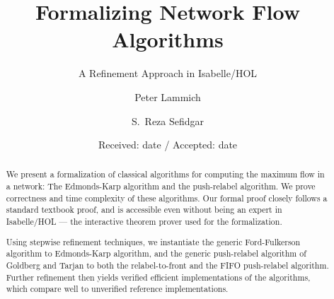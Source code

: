 \documentclass[smallcondensed]{svjour3}     %
\begin{document}
\title{Formalizing Network Flow Algorithms}
\subtitle{A Refinement Approach in Isabelle/HOL}


\author{Peter Lammich \and S.~Reza Sefidgar}



\date{Received: date / Accepted: date}


\maketitle

\begin{abstract}
We present a formalization of classical algorithms for computing the maximum flow in a network:
The Edmonds-Karp algorithm and the push-relabel algorithm. 
We prove correctness and time complexity of these algorithms.
Our formal proof closely follows a standard textbook proof, and is accessible even without being
an expert in Isabelle/HOL --- the interactive theorem prover used for the formalization.

Using stepwise refinement techniques, we instantiate the generic Ford-Fulkerson algorithm to Edmonds-Karp algorithm, 
and the generic push-relabel algorithm of Goldberg and Tarjan to both the relabel-to-front and the FIFO push-relabel algorithm.
Further refinement then yields verified efficient implementations of the algorithms, which compare well to unverified reference implementations.

\end{abstract}
\end{document}
